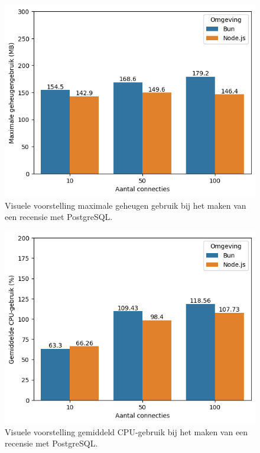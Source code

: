   \begin{figure}[H]
    \centering
    \includegraphics[width=0.7\columnwidth]{graphics/PostPostgresRAM.png}
    \caption[Geheugengebruik POST verzoek met PostgreSQL]{\label{fig:postgeheugenpostgres}Visuele voorstelling maximale geheugen gebruik bij het maken van een recensie met PostgreSQL.}
  \end{figure}
  \begin{figure}[H]
    \centering
    \includegraphics[width=0.7\columnwidth]{graphics/PostMySqlCpu.png}
    \caption[CPU-gebruik POST verzoek met PostgreSQL]{\label{fig:postcpupostgres}Visuele voorstelling gemiddeld CPU-gebruik bij het maken van een recensie met PostgreSQL.}
  \end{figure}

